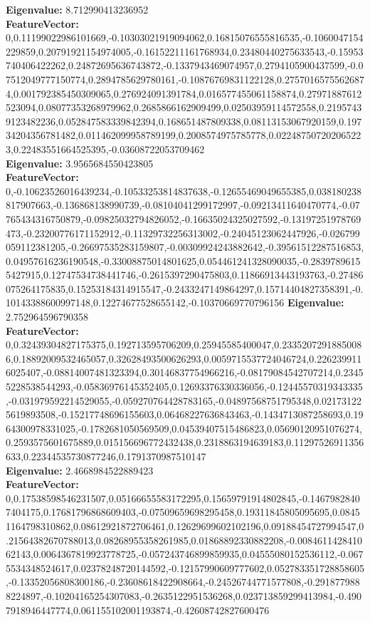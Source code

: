 \documentclass[11pt]{article}
\begin{document}
\textbf{Eigenvalue:} 8.712990413236952 \\
\textbf{FeatureVector:} 0,0.11199022986101669,-0.10303021919094062,0.16815076555816535,-0.1060047154229859,0.20791921154974005,-0.16152211161768934,0.23480440275633543,-0.15953740406422262,0.24872695636743872,-0.1337943469074957,0.2794105900437599,-0.07512049777150774,0.2894785629780161,-0.10876769831122128,0.27570165755626874,0.001792385450309065,0.276924091391784,0.016577455061158874,0.27971887612523094,0.08077353268979962,0.2685866162909499,0.02503959114572558,0.21957439123482236,0.052847583339842394,0.168651487809338,0.08113153067920159,0.19734204356781482,0.011462099958789199,0.2008574975785778,0.022487507202065223,0.22483551664525395,-0.03608722053709462 \\
\textbf{Eigenvalue:} 3.9565684550423805 \\
\textbf{FeatureVector:} 0,-0.10623526016439234,-0.10533253814837638,-0.12655469049655385,0.038180238817907663,-0.136868138990739,-0.08104041299172997,-0.09213411640470774,-0.07765434316750879,-0.09825032794826052,-0.16635024325027592,-0.13197251978769473,-0.23200776171152912,-0.11329732256313002,-0.24045123062447926,-0.026799059112381205,-0.26697535283159807,-0.00309924243882642,-0.39561512287516853,0.04957616236190548,-0.33008875014801625,0.054461241328090035,-0.28397896155427915,0.12747534738441746,-0.2615397290475803,0.11866913443193763,-0.27486075264175835,0.15253184314915547,-0.2433247149864297,0.15714404827358391,-0.10143388600997148,0.12274677528655142,-0.10370669770796156
\textbf{Eigenvalue:} 2.752964596790358 \\
\textbf{FeatureVector:} 0,0.32439304827175375,0.192713595706209,0.25945585400047,0.23352072918850086,0.18892009532465057,0.32628493500626293,0.0059715537724046724,0.2262399116025407,-0.08814007481323394,0.30146837754966216,-0.08179084542707214,0.23455228538544293,-0.05836976145352405,0.12693376330336056,-0.12445570319343335,-0.031979592214529055,-0.059270764428783165,-0.04897568751795348,0.021731225619893508,-0.15217748696155603,0.06468227636843463,-0.1434713087258693,0.1964300978331025,-0.1782681050569509,0.04539407515486823,0.05690120951076274,0.2593575601675889,0.015156696772432438,0.2318863194639183,0.11297526911356633,0.22344535730877246,0.1791370987510147 \\
\textbf{Eigenvalue:} 2.4668984522889423 \\
\textbf{FeatureVector:} 0,0.17538598546231507,0.05166655583172295,0.15659791914802845,-0.14679828407404175,0.17681796868609403,-0.07509659698295458,0.19311845805095695,0.08451164798310862,0.08612921872706461,0.12629699602102196,0.09188454727994547,0.21564382670788013,0.08268955358261985,0.01868892330882208,-0.008461142841062143,0.0064367819923778725,-0.057243746899859935,0.04555080152536112,-0.0675534348524617,0.02378248720144592,-0.12157990609777602,0.052783351728858605,-0.13352056808300186,-0.23608618422908664,-0.24526744771577808,-0.2918779888224897,-0.10204165254307083,-0.2635122951536268,0.023713859299413984,-0.4907918946447774,0.061155102001193874,-0.42608742827600476 \\
\end{document}
